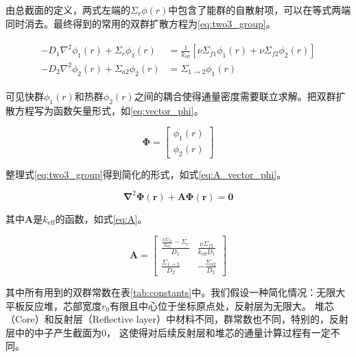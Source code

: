 由总截面的定义，两式左端的$\Sigma_r\phi(r)$中包含了能群的自散射项，可以在等式两端同时消去。最终得到的常用的双群扩散方程为\ref{eq:two3_group}。

\begin{align}
    \label{eq:two3_group}
    \begin{split}
        -D_1\nabla^2\phi_1(r) + \Sigma_r\phi_1(r) &= \frac{1}{k_\mathrm{eff}}\left[\nu\Sigma_{f1}\phi_1(r)+\nu\Sigma_{f2}\phi_2(r)\right] \\
        -D_2\nabla^2\phi_2(r) + \Sigma_{a2}\phi_2(r) &= \Sigma_{1\rightarrow 2}\phi_1(r)
    \end{split}
\end{align}

可见快群$\phi_1(r)$和热群$\phi_2(r)$之间的耦合使得通量密度需要联立求解。把双群扩散方程写为函数矢量形式，如\ref{eq:vector_phi}。

\begin{equation}
    \label{eq:vector_phi}
    \pmb{\Phi} = \begin{bmatrix}
        \phi_1(r) \\
        \phi_2(r)
    \end{bmatrix}
\end{equation}

整理式\ref{eq:two3_group}得到简化的形式，如式\ref{eq:A_vector_phi}。

\begin{equation}
    \label{eq:A_vector_phi}
    \pmb{\nabla}^2\pmb{\Phi}(\pmb{r})+\pmb{A}\pmb{\Phi}(\pmb{r}) = \pmb{0}
\end{equation}

其中$\pmb{A}$是$k_\mathrm{eff}$的函数，如式\ref{eq:A}。

\begin{equation}
    \label{eq:A}
    \pmb{A} = \begin{bmatrix}
        \frac{\frac{\nu\Sigma_{f1}}{k_\mathrm{eff}}-\Sigma_r}{D_1} & \frac{\nu\Sigma_{f2}}{k_\mathrm{eff}D_1} \\
        \frac{\Sigma_{1\rightarrow2}}{D_2} & -\frac{\Sigma_{a2}}{D_2}
    \end{bmatrix}
\end{equation}

其中所有用到的双群常数在表\ref{tab:constants}中。我们假设一种简化情况：无限大平板反应堆，芯部宽度$r_0$有限且中心位于坐标原点处，反射层为无限大。
堆芯（Core）和反射层（Reflective layer）中材料不同，群常数也不同，特别的，反射层中的中子产生截面为$0$，
这使得对后续反射层和堆芯的通量计算过程有一定不同。

